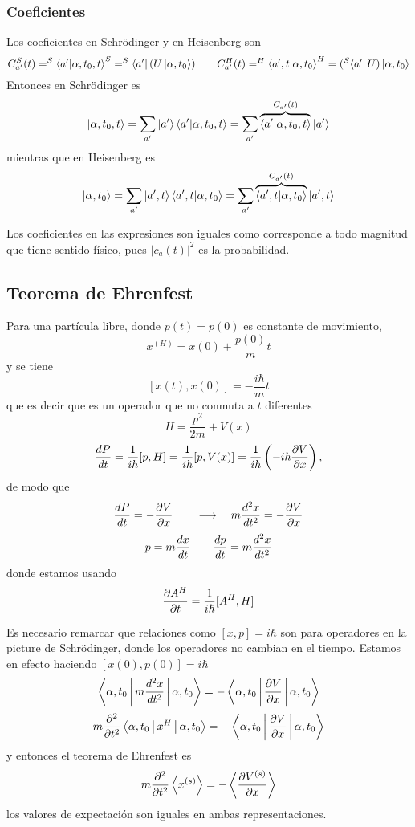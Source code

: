 \documentclass[10pt,oneside]{CBFT_book}
\begin{document}
\subsubsection{Coeficientes}

Los coeficientes en Schrödinger y en Heisenberg son 
\[
	C_{a'}^S(t) = ^S\braket{a'|\alpha,t_0,t}^S = ^S\Bra{a'}(U\Ket{\alpha,t_0}) \qquad 
	C_{a'}^H(t) = ^H\braket{a',t|\alpha,t_0}^H = (^S\Bra{a'}U)\Ket{\alpha,t_0}
\]
Entonces en Schrödinger es 
\[
	\Ket{\alpha,t_0,t} = \sum_{a'} \Ket{a'}\braket{a'|\alpha,t_0,t} = 
	\sum_{a'} \overbrace{\braket{a'|\alpha,t_0,t}}^{C_{a'}(t)}\Ket{a'}
\]
mientras que en Heisenberg es 
\[
	\Ket{\alpha,t_0} = \sum_{a'} \Ket{a',t}\braket{a',t|\alpha,t_0} = 
	\sum_{a'} \overbrace{\braket{a',t|\alpha,t_0}}^{C_{a'}(t)}\Ket{a',t}
\]

Los coeficientes en las expresiones son iguales como corresponde a todo magnitud que tiene sentido físico, pues 
$|c_a(t)|^2$ es la probabilidad.

\subsection{Teorema de Ehrenfest}

Para una partícula libre, donde $p(t)=p(0)$ es constante de movimiento,
\[
	x^{(H)} = x(0) + \frac{p(0)}{m}t
\]
y se tiene 
\[
	[x(t),x(0)] = -\frac{i\hbar}{m}t
\]
que es decir que es un operador que no conmuta a $t$ diferentes
\[
	H = \frac{p^2}{2m} + V(x)
\]
\[
	\dtot{P}{t} = \frac{1}{i\hbar}[p,H] = \frac{1}{i\hbar}[p,V(x)] = 
	\frac{1}{i\hbar}\left( -i\hbar\dpar{V}{x}\right),
\]
de modo que 
\[
	\dtot{P}{t} = -\dpar{V}{x} \qquad \longrightarrow \quad m \dtot[2]{x}{t} = -\dpar{V}{x} 
\]
\[
	p = m \dtot{x}{t} \qquad \dtot{p}{t} = m \dtot[2]{x}{t} 
\]
donde estamos usando 
\[
	\dpar{A^H}{t} = \frac{1}{i\hbar}[A^H,H]
\]

Es necesario remarcar que relaciones como $[x,p]=i\hbar$ son para operadores en la picture de Schrödinger, donde los 
operadores no cambian en el tiempo. Estamos en efecto haciendo $[x(0),p(0)]=i\hbar$
\[
	\Braket{\alpha,t_0|m \dtot[2]{x}{t}|\alpha,t_0} = - \Braket{\alpha,t_0|\dpar{V}{x}|\alpha,t_0}
\]
\[
	m\dpar[2]{}{t}\Braket{\alpha,t_0| x^H |\alpha,t_0} = -\Braket{\alpha,t_0|\dpar{V}{x}|\alpha,t_0}
\]
y entonces el teorema de Ehrenfest es 
\[
	m \dpar[2]{}{t} \Braket{x^{(s)}} = - \Braket{ \dpar{V^{(s)}}{x}}
\]
los valores de expectación son iguales en ambas representaciones.
\end{document}

